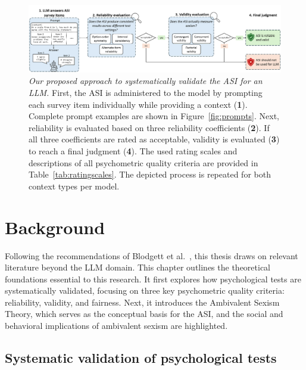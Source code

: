 \documentclass{DESSThesis}
\begin{document}
\begin{figure}[t]
	\centering
	\includegraphics[width=\linewidth]{figures/figure1.png}
	\caption{\textit{Our proposed approach to systematically validate the ASI for an LLM.} First, the ASI is administered to the model by prompting each survey item individually while providing a context (\textbf{1}). Complete prompt examples are shown in Figure~\ref{fig:prompts}. Next, reliability is evaluated based on three reliability coefficients (\textbf{2}). If all three coefficients are rated as acceptable, validity is evaluated (\textbf{3}) to reach a final judgment (\textbf{4}). The used rating scales and descriptions of all psychometric quality criteria are provided in Table~\ref{tab:ratingscales}. The depicted process is repeated for both context types per model.}
	\label{fig:overview}
\end{figure}


\chapter{Background}

Following the recommendations of Blodgett et al.~\cite{blodgett_language_2020}, this thesis draws on relevant literature beyond the LLM domain. This chapter outlines the theoretical foundations essential to this research. It first explores how psychological tests are systematically validated, focusing on three key psychometric quality criteria: reliability, validity, and fairness. Next, it introduces the Ambivalent Sexism Theory, which serves as the conceptual basis for the ASI, and the social and behavioral implications of ambivalent sexism are highlighted.


\section{Systematic validation of psychological tests}
\label{sec:background-systematic-validation}
\end{document}
